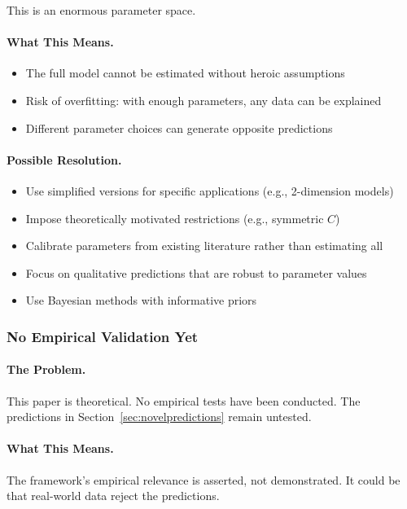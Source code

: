 This is an enormous parameter space.

\paragraph{What This Means.}
\begin{itemize}
  \item The full model cannot be estimated without heroic assumptions
  \item Risk of overfitting: with enough parameters, any data can be explained
  \item Different parameter choices can generate opposite predictions
\end{itemize}

\paragraph{Possible Resolution.}
\begin{itemize}
  \item Use simplified versions for specific applications (e.g., 2-dimension models)
  \item Impose theoretically motivated restrictions (e.g., symmetric $C$)
  \item Calibrate parameters from existing literature rather than estimating all
  \item Focus on qualitative predictions that are robust to parameter values
  \item Use Bayesian methods with informative priors
\end{itemize}

\subsubsection{No Empirical Validation Yet}

\paragraph{The Problem.}
This paper is theoretical. No empirical tests have been conducted.
The predictions in Section~\ref{sec:novelpredictions} remain untested.

\paragraph{What This Means.}
The framework's empirical relevance is asserted, not demonstrated.
It could be that real-world data reject the predictions.

